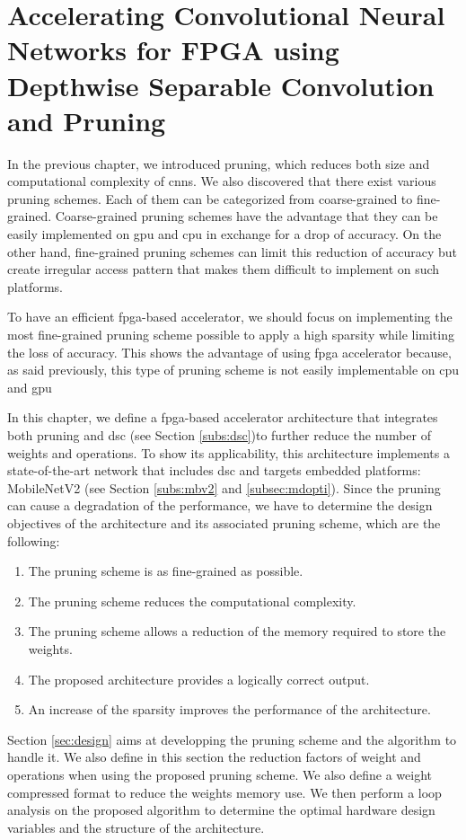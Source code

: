 \chapter{Accelerating Convolutional Neural Networks for FPGA using Depthwise Separable Convolution and Pruning} \label{chap:pratique}
%
%
In the previous chapter, we introduced pruning, which reduces both size and computational complexity of \acrshort{cnn}s. We also discovered that there exist various pruning schemes. Each of them can be categorized from coarse-grained to fine-grained. Coarse-grained pruning schemes have the advantage that they can be easily implemented on \acrshort{gpu} and \acrshort{cpu} in exchange for a drop of accuracy. On the other hand, fine-grained pruning schemes can limit this reduction of accuracy but create irregular access pattern that makes them difficult to implement on such platforms. 

To have an efficient \acrshort{fpga}-based accelerator, we should focus on implementing the most fine-grained pruning scheme possible to apply a high sparsity while limiting the loss of accuracy. This shows the advantage of using \acrshort{fpga} accelerator because, as said previously, this type of pruning scheme is not easily implementable on \acrshort{cpu} and \acrshort{gpu}

In this chapter, we define a \acrshort{fpga}-based accelerator architecture that integrates both pruning and \acrshort{dsc} (see Section \ref{subs:dsc})to further reduce the number of weights and operations. To show its applicability, this architecture implements a state-of-the-art network that includes \acrshort{dsc} and targets embedded platforms: MobileNetV2 (see Section \ref{subs:mbv2} and \ref{subsec:mdopti}). Since the pruning can cause a degradation of the performance, we have to determine the design objectives of the architecture and its associated pruning scheme, which are the following:
%
\begin{enumerate}
    \item The pruning scheme is as fine-grained as possible.
    \item The pruning scheme reduces the computational complexity.
    \item The pruning scheme allows a reduction of the memory required to store the weights.
    \item The proposed architecture provides a logically correct output.
    \item An increase of the sparsity improves the performance of the architecture.
\end{enumerate}
%
Section \ref{sec:design} aims at developping the pruning scheme and the algorithm to handle it. We also define in this section the reduction factors of weight and operations when using the proposed pruning scheme. We also define a weight compressed format to reduce the weights memory use. We then perform a loop analysis on the proposed algorithm to determine the optimal hardware design variables and the structure of the architecture.

